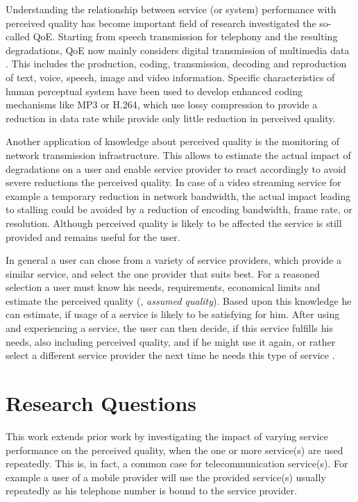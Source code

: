 Understanding the relationship between service (or system) performance with perceived quality has become important field of research investigated the so-called \ac{QoE}.
Starting from speech transmission for telephony \citep[\cf,][]{IEEE Recommended Practice for Speech Quality Measurements} and the resulting degradations, \ac{QoE} now mainly considers digital transmission of multimedia data \citep{moller_quality_2014}.
This includes the production, coding, transmission, decoding and reproduction of text, voice, speech, image and video information.
Specific characteristics of human perceptual system have been used to develop enhanced coding mechanisms like \ac{MP3} or \ac{H.264}, which use lossy compression to provide a reduction in data rate while provide only little reduction in perceived quality.

Another application of knowledge about perceived quality is the monitoring of network transmission infrastructure.
This allows to estimate the actual impact of degradations on a user and enable service provider to react accordingly to avoid severe reductions the perceived quality.
In case of a video streaming service for example a temporary reduction in network bandwidth, the actual impact leading to stalling could be avoided by a reduction of encoding bandwidth, frame rate, or resolution.
Although perceived quality is likely to be affected the service is still provided and remains useful for the user.

In general a user can chose from a variety of service providers, which provide a similar service, and select the one provider that suits best.
For a reasoned selection a user must know his needs, requirements, economical limits and estimate the perceived quality (\ie, \emph{assumed quality}).
Based upon this knowledge he can estimate, if usage of a service is likely to be satisfying for him.
After using and experiencing a service, the user can then decide, if this service fulfills his needs, also including perceived quality, and if he might use it again, or rather select a different service provider the next time he needs this type of service \citep[\cf,][]{geerts_linking_2010}.

\section{Research Questions}
This work extends prior work by investigating the impact of varying service performance on the perceived quality, when the one or more service(s) are used repeatedly.
This is, in fact, a common case for telecommunication service(s).
For example a user of a mobile  provider will use the provided service(s) usually repeatedly as his telephone number is bound to the service provider.

